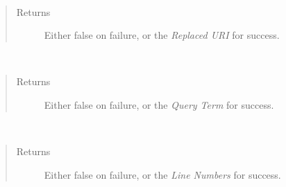 \documentclass[letterpaper,10pt,english]{sphinxmanual}
\begin{document}
\begin{fulllineitems}
\begin{fulllineitems}
\begin{quote}
\begin{description}
\end{description}\end{quote}

\end{fulllineitems}


\begin{fulllineitems}
\label{docs/api:MappingEntry::getReplacedURI}~\begin{quote}\begin{description}
\item[{Returns}] \leavevmode
Either false on failure, or the \emph{Replaced URI} for success.

\end{description}\end{quote}

\end{fulllineitems}


\begin{fulllineitems}
\label{docs/api:MappingEntry::getQueryTerm}~\begin{quote}\begin{description}
\item[{Returns}] \leavevmode
Either false on failure, or the \emph{Query Term} for success.

\end{description}\end{quote}

\end{fulllineitems}


\begin{fulllineitems}
\label{docs/api:MappingEntry::getLineNumbers}~\begin{quote}\begin{description}
\item[{Returns}] \leavevmode
Either false on failure, or the \emph{Line Numbers} for success.

\end{description}\end{quote}

\end{fulllineitems}


\end{fulllineitems}
\end{document}
